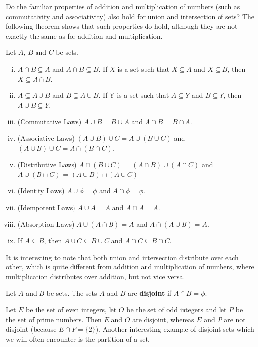 \documentclass[a4paper,english,12pt]{article}
\begin{document}
Do the familiar properties of addition and multiplication of numbers (such as commutativity and associativity) also hold for union and intersection of sets? The following theorem shows that such properties do hold, although they are not exactly the same as for addition and multiplication.
\begin{thm}
 Let $A$, $B$ and $C$ be sets. 
\begin{enumerate} [i)]
\item $A \cap B \subseteq A$ and $A \cap B \subseteq B$. If $X$ is a set such that $X \subseteq A$ and $X \subseteq B$, then 
$X \subseteq A \cap B $.
\item $A \subseteq A \cup B $ and $B \subseteq A \cup B $. If Y is a set such that $A \subseteq Y$ and $B \subseteq Y$, then $A \cup B \subseteq Y$.
\item (Commutative Laws) $A \cup B = B \cup A$ and $A \cap B = B \cap A$.
\item (Associative Laws) $(A \cup B) \cup C = A \cup (B \cup C)$ and $(A \cup B) \cup C = A \cap (B \cap C)$. 
\item (Distributive Laws) $A \cap (B \cup C)$ = $(A \cap B) \cup (A \cap C)$ and $A \cup (B \cap C)$ = $(A \cup B) \cap (A \cup C)$
\item (Identity Laws) $A \cup \phi = \phi$ and $A \cap \phi = \phi$.
\item (Idempotent Laws) $A \cup A = A$ and $A \cap A = A$.
\item (Absorption Laws) $A \cup (A \cap B) = A$ and $A \cap (A \cup B) = A$.
\item If $A \subseteq B$, then $A \cup C \subseteq B \cup C$ and $A \cap C \subseteq B \cap C$.
\end{enumerate}
\end{thm}

It is interesting to note that both union and intersection distribute over each other, which is quite different from addition and multiplication of numbers, where multiplication distributes over addition, but not vice versa.

\begin{defn} 
Let $A$ and $B$ be sets. The sets $A$ and $B$ are \textbf{disjoint} if $A \cap B = \phi$.
\end{defn}

\begin{exmp}
Let $E$ be the set of even integers, let $O$ be the set of odd integers and let $P$ be the set of prime numbers. Then $E$ and $O$ are disjoint, 
whereas $E$ and $P$ are not disjoint (because $E \cap P = \{2\}$). Another interesting example of disjoint sets which we will often encounter 
is the partition of a set.
\end{exmp}
\end{document}
